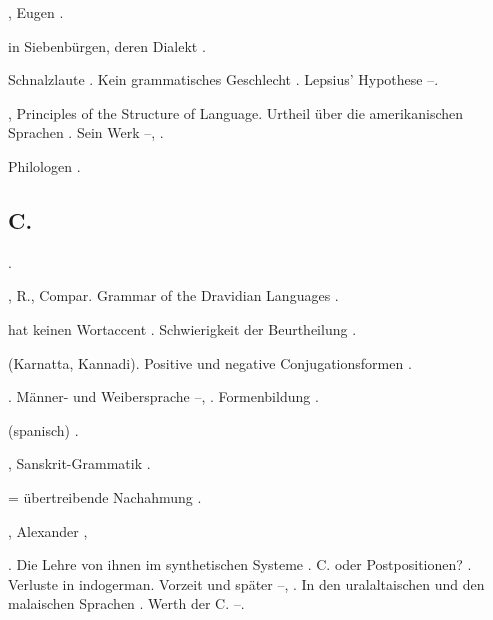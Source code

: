 \begin{register}
, Eugen \sed{\pageref{sp.28},} \pageref{sp.31}.

 in Siebenbürgen, deren Dialekt \pageref{sp.190}.

 Schnalzlaute \pageref{sp.34}\sed{, \pageref{sp.269}}. Kein grammatisches Geschlecht \pageref{sp.150}. Lepsius’ Hypothese \pageref{sp.282}–\pageref{sp.283}.


, Principles of the Structure of Language. Urtheil über die amerikanischen Sprachen \pageref{sp.424}. Sein Werk \pageref{sp.426}–\pageref{sp.427}, \pageref{sp.459}.

 Philologen \pageref{sp.21}.

\subsection*{C.}\label{reg.C}

 \pageref{sp.314}.

, R., Compar. Grammar of the Dravidian Languages \pageref{sp.344}.

 hat keinen Wortaccent \pageref{sp.148}. Schwierigkeit der Beurtheilung \pageref{sp.426}.


 (Karnatta, Kannadi). Positive und negative Conjugationsformen \pageref{sp.344}.

. Männer- und Weibersprache \pageref{sp.248}–\pageref{sp.249}, \pageref{sp.428}. Formenbildung \pageref{sp.328}.

 (spanisch) \pageref{sp.322}.

, Sanskrit-Grammatik \pageref{sp.26}.

 = übertreibende Nachahmung \pageref{sp.104}.



, Alexander \pageref{sp.81}, \pageref{sp.69}

. Die Lehre von ihnen im synthetischen Systeme \pageref{sp.102}. C. oder Postpositionen? \pageref{sp.115}. Verluste in indogerman. Vorzeit und später \pageref{sp.253}–\pageref{sp.254}, \pageref{sp.354}. In den uralaltaischen und den malaischen Sprachen \pageref{sp.415}\sed{, \pageref{sp.420}}. Werth der C. \pageref{sp.461}–\pageref{sp.463}.


\end{register}
